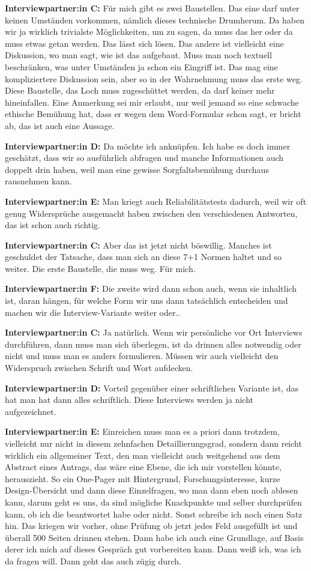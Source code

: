 \documentclass[a4paper,12pt,twoside]{scrreprt}
\begin{document}
\textbf{Interviewpartner:in C:} Für mich gibt es zwei Baustellen. Das eine darf unter keinen Umständen vorkommen, nämlich dieses technische Drumherum. Da haben wir ja wirklich trivialste Möglichkeiten, um zu sagen, da muss das her oder da muss etwas getan werden. Das lässt sich lösen. Das andere ist vielleicht eine Diskussion, wo man sagt, wie ist das aufgebaut. Muss man noch textuell beschränken, was unter Umständen ja schon ein Eingriff ist. Das mag eine kompliziertere Diskussion sein, aber so in der Wahrnehmung muss das erste weg. Diese Baustelle, das Loch muss zugeschüttet werden, da darf keiner mehr hineinfallen. Eine Anmerkung sei mir erlaubt, nur weil jemand so eine schwache ethische Bemühung hat, dass er wegen dem Word-Formular schon sagt, er bricht ab, das ist auch eine Aussage.

\textbf{Interviewpartner:in D:} Da möchte ich anknüpfen. Ich habe es doch immer geschätzt, dass wir so ausführlich abfragen und manche Informationen auch doppelt drin haben, weil man eine gewisse Sorgfaltsbemühung durchaus rausnehmen kann.

\textbf{Interviewpartner:in E:} Man kriegt auch Reliabilitätstests dadurch, weil wir oft genug Widersprüche ausgemacht haben zwischen den verschiedenen Antworten, das ist schon auch richtig.

\textbf{Interviewpartner:in C:} Aber das ist jetzt nicht böswillig. Manches ist geschuldet der Tatsache, dass man sich an diese 7+1 Normen haltet und so weiter. Die erste Baustelle, die muss weg. Für mich.

\textbf{Interviewpartner:in F:} Die zweite wird dann schon auch, wenn sie inhaltlich ist, daran hängen, für welche Form wir uns dann tatsächlich entscheiden und machen wir die Interview-Variante weiter oder..

\textbf{Interviewpartner:in C:} Ja natürlich. Wenn wir persönliche vor Ort Interviews durchführen, dann muss man sich überlegen, ist da drinnen alles notwendig oder nicht und muss man es anders formulieren. Müssen wir auch vielleicht den Widerspruch zwischen Schrift und Wort aufdecken.

\textbf{Interviewpartner:in D:} Vorteil gegenüber einer schriftlichen Variante ist, das hat man hat dann alles schriftlich. Diese Interviews werden ja nicht aufgezeichnet.

\textbf{Interviewpartner:in E:} Einreichen muss man es a priori dann trotzdem, vielleicht nur nicht in diesem zehnfachen Detaillierungsgrad, sondern dann reicht wirklich ein allgemeiner Text, den man vielleicht auch weitgehend aus dem Abstract eines Antrags, das wäre eine Ebene, die ich mir vorstellen könnte, herauszieht. So ein One-Pager mit Hintergrund, Forschungsinteresse, kurze Design-Übersicht und dann diese Einzelfragen, wo man dann eben noch ablesen kann, darum geht es uns, da sind mögliche Knackpunkte und selber durchprüfen kann, ob ich die beantwortet habe oder nicht. Sonst schreibe ich noch einen Satz hin. Das kriegen wir vorher, ohne Prüfung ob jetzt jedes Feld ausgefüllt ist und überall 500 Seiten drinnen stehen. Dann habe ich auch eine Grundlage, auf Basis derer ich mich auf dieses Gespräch gut vorbereiten kann. Dann weiß ich, was ich da fragen will. Dann geht das auch zügig durch.
\end{document}
